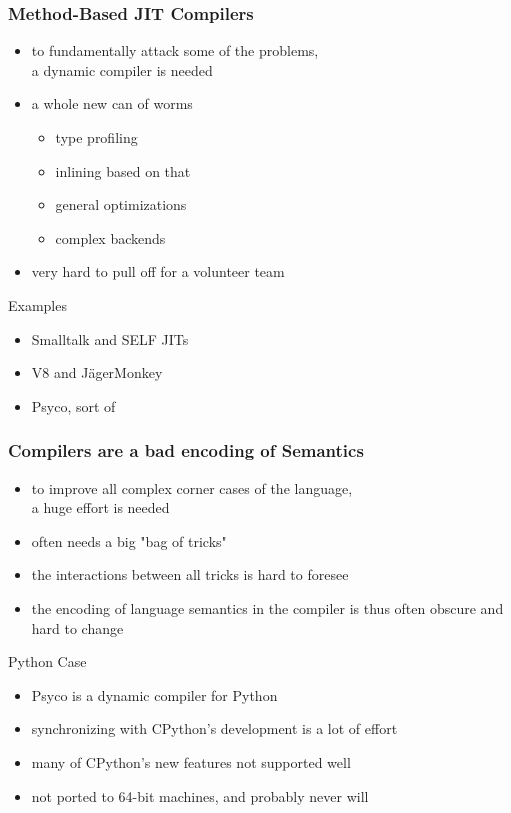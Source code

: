 \documentclass[utf8x]{beamer}
\begin{document}
\begin{frame}
  \frametitle{Method-Based JIT Compilers}
  \begin{itemize}
      \item to fundamentally attack some of the problems, \\
      a dynamic compiler is needed
      \item a whole new can of worms
      \pause
      \begin{itemize}
          \item type profiling
          \item inlining based on that
          \item general optimizations
          \item complex backends
      \end{itemize}
      \item very hard to pull off for a volunteer team
  \end{itemize}
  \pause
  \begin{block}{Examples}
      \begin{itemize}
          \item Smalltalk and SELF JITs
          \item V8 and JägerMonkey
          \item Psyco, sort of
      \end{itemize}
  \end{block}
\end{frame}

\begin{frame}
  \frametitle{Compilers are a bad encoding of Semantics}
  \begin{itemize}
  \item to improve all complex corner cases of the language, \\
  a huge effort is needed
  \item often needs a big "bag of tricks"
  \item the interactions between all tricks is hard to foresee
  \item the encoding of language semantics in the compiler is thus often obscure and hard to change
  \end{itemize}
  \pause
  \begin{block}{
    Python Case}
    \begin{itemize}
    \item Psyco is a dynamic compiler for Python
    \item synchronizing with CPython's development is a lot of effort
    \item many of CPython's new features not supported well
    \item not ported to 64-bit machines, and probably never will
    \end{itemize}
  \end{block}
\end{frame}
\end{document}
